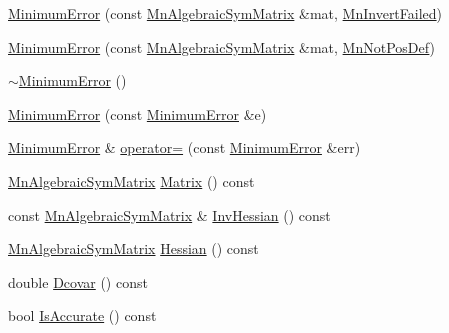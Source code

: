 \begin{DoxyCompactItemize}
\item 
\mbox{\hyperlink{classROOT_1_1Minuit2_1_1MinimumError_a91e6b02e914170669e0d10f9e8c38735}{Minimum\+Error}} (const \mbox{\hyperlink{namespaceROOT_1_1Minuit2_a9e74ad97f5537a2e80e52b04d98ecc6e}{Mn\+Algebraic\+Sym\+Matrix}} \&mat, \mbox{\hyperlink{classROOT_1_1Minuit2_1_1MinimumError_1_1MnInvertFailed}{Mn\+Invert\+Failed}})
\item 
\mbox{\hyperlink{classROOT_1_1Minuit2_1_1MinimumError_afb993aad7059efe22f48f2496e3664a9}{Minimum\+Error}} (const \mbox{\hyperlink{namespaceROOT_1_1Minuit2_a9e74ad97f5537a2e80e52b04d98ecc6e}{Mn\+Algebraic\+Sym\+Matrix}} \&mat, \mbox{\hyperlink{classROOT_1_1Minuit2_1_1MinimumError_1_1MnNotPosDef}{Mn\+Not\+Pos\+Def}})
\item 
\mbox{\hyperlink{classROOT_1_1Minuit2_1_1MinimumError_a24b67f819804d118f9e98a7a7a3e9968}{$\sim$\+Minimum\+Error}} ()
\item 
\mbox{\hyperlink{classROOT_1_1Minuit2_1_1MinimumError_a13cdd3740a255f9da59aa38a829bdc2d}{Minimum\+Error}} (const \mbox{\hyperlink{classROOT_1_1Minuit2_1_1MinimumError}{Minimum\+Error}} \&e)
\item 
\mbox{\hyperlink{classROOT_1_1Minuit2_1_1MinimumError}{Minimum\+Error}} \& \mbox{\hyperlink{classROOT_1_1Minuit2_1_1MinimumError_a991c1899c07aa31f7a61d77b648c07ad}{operator=}} (const \mbox{\hyperlink{classROOT_1_1Minuit2_1_1MinimumError}{Minimum\+Error}} \&err)
\item 
\mbox{\hyperlink{namespaceROOT_1_1Minuit2_a9e74ad97f5537a2e80e52b04d98ecc6e}{Mn\+Algebraic\+Sym\+Matrix}} \mbox{\hyperlink{classROOT_1_1Minuit2_1_1MinimumError_a7065d453e2892ed1c25b7f28d0c1aa66}{Matrix}} () const
\item 
const \mbox{\hyperlink{namespaceROOT_1_1Minuit2_a9e74ad97f5537a2e80e52b04d98ecc6e}{Mn\+Algebraic\+Sym\+Matrix}} \& \mbox{\hyperlink{classROOT_1_1Minuit2_1_1MinimumError_acfa9206a47e5fdf2d9aa1928aaf5cd04}{Inv\+Hessian}} () const
\item 
\mbox{\hyperlink{namespaceROOT_1_1Minuit2_a9e74ad97f5537a2e80e52b04d98ecc6e}{Mn\+Algebraic\+Sym\+Matrix}} \mbox{\hyperlink{classROOT_1_1Minuit2_1_1MinimumError_a7f591009a8e0d017a77da5efa5f6a7e0}{Hessian}} () const
\item 
double \mbox{\hyperlink{classROOT_1_1Minuit2_1_1MinimumError_acd4dec46c23542a2b79183a6d5fe6679}{Dcovar}} () const
\item 
bool \mbox{\hyperlink{classROOT_1_1Minuit2_1_1MinimumError_a70c9ff6b59f2c01e5e54b4010326753d}{Is\+Accurate}} () const
\item 

\end{DoxyCompactItemize}
